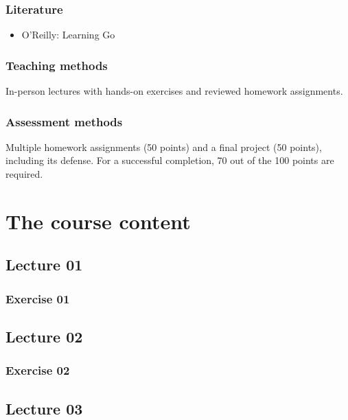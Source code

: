 \documentclass[
  digital,
  color,
  oneside,
  nosansbold,
  nocolorbold,
  lof,
  lot,
]{fithesis4}
\begin{document}
\subsection{Literature}

\begin{itemize}
    \item O'Reilly: Learning Go \cite{oreilly-learning-go}
\end{itemize}

\subsection{Teaching methods}

In-person lectures with hands-on exercises and reviewed homework assignments.

\subsection{Assessment methods}

Multiple homework assignments (50 points) and a final project (50 points), including its defense. For a successful completion, 70 out of the 100 points are required.

\chapter{The course content}

\section{Lecture 01}

\subsection{Exercise 01}

\section{Lecture 02}

\subsection{Exercise 02}

\section{Lecture 03}
\end{document}
